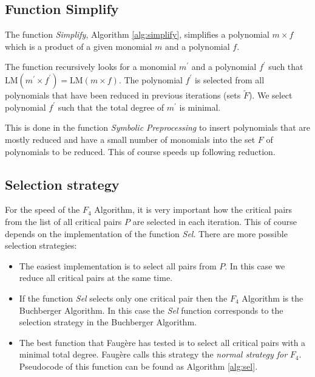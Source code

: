 

\subsection{Function Simplify}
The function \textit{Simplify}, Algorithm \ref{alg:simplify}, simplifies a polynomial $m \times f$ which is a product of a given monomial $m$ and a polynomial $f$.

The function recursively looks for a monomial $m^\prime$ and a polynomial $f^\prime$ such that $\textrm{LM}(m^\prime\times f^\prime) = \textrm{LM}(m\times f)$. The polynomial $f^\prime$ is selected from all polynomials that have been reduced in previous iterations (sets $\tilde{F}$). We select polynomial $f^\prime$ such that the total degree of $m^\prime$ is minimal.

This is done in the function \textit{Symbolic Preprocessing} to insert polynomials that are mostly reduced and have a small number of monomials into the set $F$ of polynomials to be reduced. This of course speeds up following reduction.



\subsection{Selection strategy}
\label{subsec:F4:sel}
For the speed of the $F_4$ Algorithm, it is very important how the critical pairs from the list of all critical pairs $P$ are selected in each iteration. This of course depends on the implementation of the function \textit{Sel}. There are more possible selection strategies:

\begin{itemize}
  \item The easiest implementation is to select all pairs from $P$. In this case we reduce all critical pairs at the same time.
  \item If the function \textit{Sel} selects only one critical pair then the $F_4$ Algorithm is the Buchberger Algorithm. In this case the \textit{Sel} function corresponds to the selection strategy in the Buchberger Algorithm.
  \item The best function that Faug\`ere has tested is to select all critical pairs with a minimal total degree. Faug\`ere calls this strategy the \textit{normal strategy for} $F_4$. Pseudocode of this function can be found as Algorithm \ref{alg:sel}.
\end{itemize}

